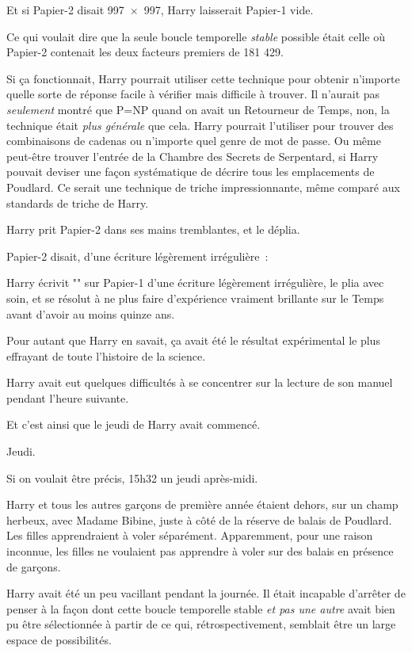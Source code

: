 Et si Papier-2 disait 997~$\times$~997, Harry laisserait Papier-1 vide.

Ce qui voulait dire que la seule boucle temporelle \emph{stable} possible était celle où Papier-2 contenait les deux facteurs premiers de 181 429.

Si ça fonctionnait, Harry pourrait utiliser cette technique pour obtenir n'importe quelle sorte de réponse facile à vérifier mais difficile à trouver. Il n'aurait pas \emph{seulement} montré que P=NP quand on avait un Retourneur de Temps, non, la technique était \emph{plus générale} que cela. Harry pourrait l'utiliser pour trouver des combinaisons de cadenas ou n'importe quel genre de mot de passe. Ou même peut-être trouver l'entrée de la Chambre des Secrets de Serpentard, si Harry pouvait deviser une façon systématique de décrire tous les emplacements de Poudlard. Ce serait une technique de triche impressionnante, même comparé aux standards de triche de Harry.

Harry prit Papier-2 dans ses mains tremblantes, et le déplia.

Papier-2 disait, d'une écriture légèrement irrégulière~:


Harry écrivit "" sur Papier-1 d'une écriture légèrement irrégulière, le plia avec soin, et se résolut à ne plus faire d'expérience vraiment brillante sur le Temps avant d'avoir au moins quinze ans.

Pour autant que Harry en savait, ça avait été le résultat expérimental le plus effrayant de toute l'histoire de la science.

Harry avait eut quelques difficultés à se concentrer sur la lecture de son manuel pendant l'heure suivante.

Et c'est ainsi que le jeudi de Harry avait commencé.

\later

Jeudi.

Si on voulait être précis, 15h32 un jeudi après-midi.

Harry et tous les autres garçons de première année étaient dehors, sur un champ herbeux, avec Madame Bibine, juste à côté de la réserve de balais de Poudlard. Les filles apprendraient à voler séparément. Apparemment, pour une raison inconnue, les filles ne voulaient pas apprendre à voler sur des balais en présence de garçons.

Harry avait été un peu vacillant pendant la journée. Il était incapable d'arrêter de penser à la façon dont cette boucle temporelle stable \emph{et pas une autre} avait bien pu être sélectionnée à partir de ce qui, rétrospectivement, semblait être un large espace de possibilités.

